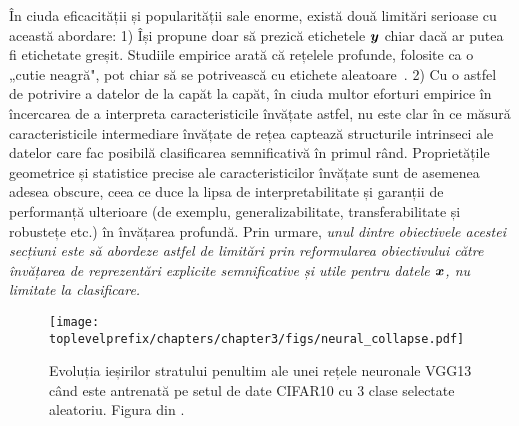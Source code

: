 \documentclass[../../book-main_ro.tex]{subfiles}
\begin{document}
În ciuda eficacității și popularității sale enorme, există două limitări serioase cu această abordare: 1) Își propune doar să prezică etichetele $\bm{y}$ chiar dacă ar putea fi etichetate greșit. Studiile empirice arată că rețelele profunde, folosite ca o „cutie neagră", pot chiar să se potrivească cu etichete aleatoare~\cite{zhang2017understanding}.
2) Cu o astfel de potrivire a datelor de la capăt la capăt, în ciuda multor eforturi empirice în încercarea de a interpreta caracteristicile învățate astfel, nu este clar în ce măsură caracteristicile intermediare învățate de rețea captează structurile intrinseci ale datelor care fac posibilă clasificarea semnificativă în primul rând. Proprietățile geometrice și statistice precise ale caracteristicilor învățate sunt de asemenea adesea obscure, ceea ce duce la lipsa de interpretabilitate și garanții de performanță ulterioare (de exemplu, generalizabilitate, transferabilitate și robustețe etc.) în învățarea profundă.
Prin urmare, {\em unul dintre obiectivele acestei secțiuni este să abordeze astfel de limitări prin reformularea obiectivului către învățarea de reprezentări explicite semnificative și utile pentru datele $\bm{x}$, nu limitate la clasificare.}

\begin{figure}
	\centering
	\texttt{[image: \\toplevelprefix/chapters/chapter3/figs/neural\_collapse.pdf]}
	\caption{Evoluția ieșirilor stratului penultim ale unei rețele neuronale VGG13 când este antrenată pe setul de date CIFAR10 cu 3 clase selectate aleatoriu. Figura din \cite{papyan2020prevalence}.}
	\label{chap4-fig:neural-collapse}
\end{figure}
\end{document}
